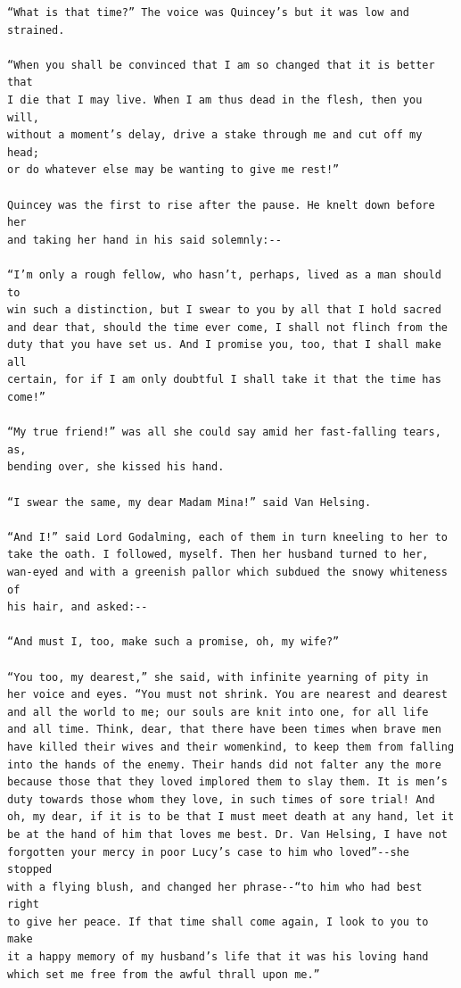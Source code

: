 \documentclass{article}
\begin{document}
\begin{verbatim}
“What is that time?” The voice was Quincey’s but it was low and
strained.

“When you shall be convinced that I am so changed that it is better that
I die that I may live. When I am thus dead in the flesh, then you will,
without a moment’s delay, drive a stake through me and cut off my head;
or do whatever else may be wanting to give me rest!”

Quincey was the first to rise after the pause. He knelt down before her
and taking her hand in his said solemnly:--

“I’m only a rough fellow, who hasn’t, perhaps, lived as a man should to
win such a distinction, but I swear to you by all that I hold sacred
and dear that, should the time ever come, I shall not flinch from the
duty that you have set us. And I promise you, too, that I shall make all
certain, for if I am only doubtful I shall take it that the time has
come!”

“My true friend!” was all she could say amid her fast-falling tears, as,
bending over, she kissed his hand.

“I swear the same, my dear Madam Mina!” said Van Helsing.

“And I!” said Lord Godalming, each of them in turn kneeling to her to
take the oath. I followed, myself. Then her husband turned to her,
wan-eyed and with a greenish pallor which subdued the snowy whiteness of
his hair, and asked:--

“And must I, too, make such a promise, oh, my wife?”

“You too, my dearest,” she said, with infinite yearning of pity in
her voice and eyes. “You must not shrink. You are nearest and dearest
and all the world to me; our souls are knit into one, for all life
and all time. Think, dear, that there have been times when brave men
have killed their wives and their womenkind, to keep them from falling
into the hands of the enemy. Their hands did not falter any the more
because those that they loved implored them to slay them. It is men’s
duty towards those whom they love, in such times of sore trial! And
oh, my dear, if it is to be that I must meet death at any hand, let it
be at the hand of him that loves me best. Dr. Van Helsing, I have not
forgotten your mercy in poor Lucy’s case to him who loved”--she stopped
with a flying blush, and changed her phrase--“to him who had best right
to give her peace. If that time shall come again, I look to you to make
it a happy memory of my husband’s life that it was his loving hand
which set me free from the awful thrall upon me.”


\end{verbatim}
\end{document}
